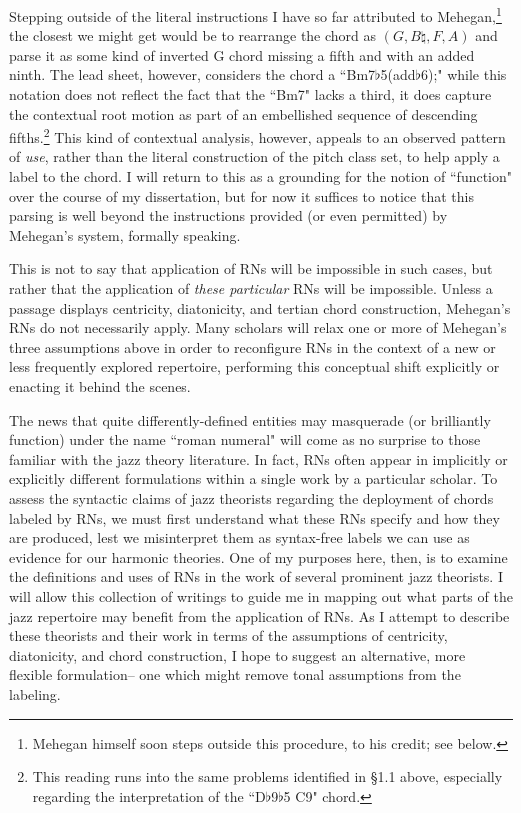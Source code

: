 Stepping outside of the literal instructions I have so far attributed to Mehegan,\footnote{Mehegan himself soon steps outside this procedure, to his credit; see below.} the closest we might get would be to rearrange the chord as $(G, B\natural, F, A)$ and parse it as some kind of inverted G chord missing a fifth and with an added ninth.  The lead sheet, however, considers the chord a ``Bm7$\flat$5(add$\flat$6);" while this notation does not reflect the fact that the ``Bm7" lacks a third, it does capture the contextual root motion as part of an embellished sequence of descending fifths.\footnote{This reading runs into the same problems identified in \S 1.1 above, especially regarding the interpretation of the ``D$\flat$9$\flat$5 C9" chord.}  This kind of contextual analysis, however, appeals to an observed pattern of \emph{use}, rather than the literal construction of the pitch class set, to help apply a label to the chord.  I will return to this as a grounding for the notion of ``function" over the course of my dissertation, but for now it suffices to notice that this parsing is well beyond the instructions provided (or even permitted) by Mehegan's system, formally speaking.

This is not to say that application of RNs will be impossible in such cases, but rather that the application of \emph{these particular} RNs will be impossible.  Unless a passage displays centricity, diatonicity, and tertian chord construction, Mehegan's RNs do not necessarily apply.  Many scholars will relax one or more of Mehegan's three assumptions above in order to reconfigure RNs in the context of a new or less frequently explored repertoire, performing this conceptual shift explicitly or enacting it behind the scenes.

The news that quite differently-defined entities may masquerade (or brilliantly function) under the name ``roman numeral" will come as no surprise to those familiar with the jazz theory literature.  In fact, RNs often appear in implicitly or explicitly different formulations within a single work by a particular scholar.  To assess the syntactic claims of jazz theorists regarding the deployment of chords labeled by RNs, we must first understand what these RNs specify and how they are produced, lest we misinterpret them as syntax-free labels we can use as evidence for our harmonic theories.  One of my purposes here, then, is to examine the definitions and uses of RNs in the work of several prominent jazz theorists.  I will allow this collection of writings to guide me in mapping out what parts of the jazz repertoire may benefit from the application of RNs.  As I attempt to describe these theorists and their work in terms of the assumptions of centricity, diatonicity, and chord construction, I hope to suggest an alternative, more flexible formulation-- one which might remove tonal assumptions from the labeling.

